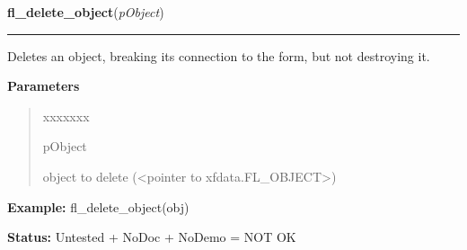 \hspace{.8\funcindent}\begin{boxedminipage}{\funcwidth}

    \raggedright \textbf{fl\_delete\_object}(\textit{pObject})

    \vspace{-1.5ex}

    \rule{\textwidth}{0.5\fboxrule}
\setlength{\parskip}{2ex}
    Deletes an object, breaking its connection to the form, but not 
    destroying it.

\setlength{\parskip}{1ex}
      \textbf{Parameters}
      \vspace{-1ex}

      \begin{quote}
        \begin{Ventry}{xxxxxxx}

          \item[pObject]

          object to delete ({\textless}pointer to 
          xfdata.FL\_OBJECT{\textgreater})

        \end{Ventry}

      \end{quote}

\textbf{Example:} fl\_delete\_object(obj)



\textbf{Status:} Untested + NoDoc + NoDemo = NOT OK



    \end{boxedminipage}

    \label{xformslib:library:fl_get_object_return_state}

    \vspace{0.5ex}

